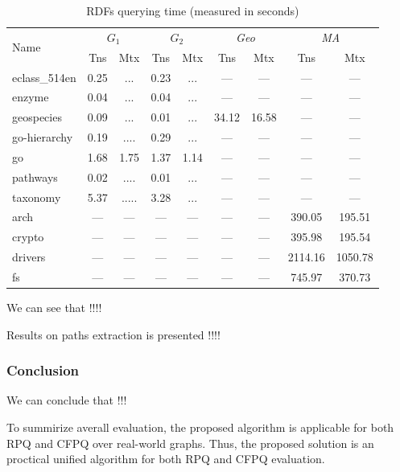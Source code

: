 {\setlength{\tabcolsep}{0.2em}
  \begin{table}
    \caption{RDFs querying time (measured in seconds)}
    \label{tbl:CFPQ_index}
    \small
    \begin{tabular}{| l | c | c | c | c | c | c | c | c |}
      \hline
      
      \multirow{2}{*}{Name}  & \multicolumn{2}{c|}{$G_1$} & \multicolumn{2}{c|}{$G_2$} & \multicolumn{2}{c|}{\textit{Geo}} & \multicolumn{2}{c|}{\textit{MA}}\\
      \cline{2-9}
                      & Tns     & Mtx     & Tns   & Mtx   & Tns    & Mtx    & Tns      & Mtx \\
      \hline
      \hline
      eclass\_514en   & 0.25   & ...    & 0.23 & ...  & ---   & ---   & ---     & ---\\
      enzyme          & 0.04   & ...    & 0.04 & ...  & ---   & ---   & ---     & ---\\
      geospecies      & 0.09   & ...    & 0.01 & ...  & 34.12 & 16.58 & ---     & ---\\
      go-hierarchy    & 0.19   & ....   & 0.29 & ...  & ---   & ---   & ---     & ---\\
      go              & 1.68   & 1.75   & 1.37 & 1.14 & ---   & ---   & ---     & ---\\
      pathways        & 0.02   & ....   & 0.01 & ...  & ---   & ---   & ---     & ---\\
      taxonomy        & 5.37   & .....  & 3.28 & ...  & ---   & ---   & ---     & ---\\
      \hline
      arch            & ---    & ---    & ---  & ---  & ---   & ---   & 390.05  & 195.51  \\
      crypto          & ---    & ---    & ---  & ---  & ---   & ---   & 395.98  & 195.54  \\
      drivers         & ---    & ---    & ---  & ---  & ---   & ---   & 2114.16 & 1050.78 \\
      fs              & ---    & ---    & ---  & ---  & ---   & ---   & 745.97  & 370.73  \\
      \hline
    \end{tabular}
  \end{table}
}

We can see that !!!!

Results on paths extraction is presented !!!!

\subsubsection{Conclusion}

We can conclude that !!!

To summirize averall evaluation, the proposed algorithm is applicable for both RPQ and CFPQ over real-world graphs. 
Thus, the proposed solution is an proctical unified algorithm for both RPQ and CFPQ evaluation.